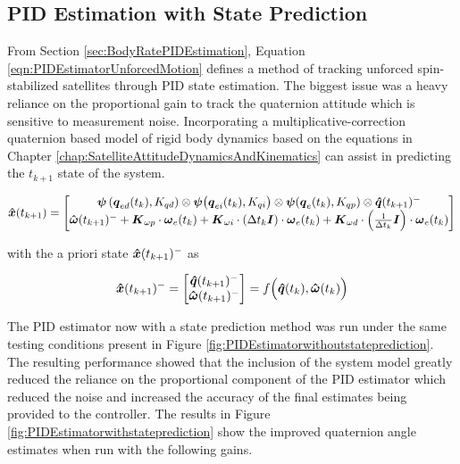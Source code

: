 \subsection{PID Estimation with State Prediction}
\label{subsec:PIDEstimatorwithStatePrediction}

From Section \ref{sec:BodyRatePIDEstimation}, Equation \ref{eqn:PIDEstimatorUnforcedMotion} defines a method of tracking unforced spin-stabilized satellites through PID state estimation.  The biggest issue was a heavy reliance on the proportional gain to track the quaternion attitude which is sensitive to measurement noise.  Incorporating a multiplicative-correction quaternion based model of rigid body dynamics based on the equations in Chapter \ref{chap:SatelliteAttitudeDynamicsAndKinematics} can assist in predicting the $t_{k+1}$ state of the system.

\begin{equation}
  \boldsymbol{\hat{x}}(t_{k+1}) = \begin{bmatrix} \boldsymbol{\psi}\left(\boldsymbol{q}_{ed}(t_k), K_{qd}\right) \otimes \boldsymbol{\psi}\big(\boldsymbol{q}_{ei}(t_k), K_{qi}\big) \otimes \boldsymbol{\psi}(\boldsymbol{q}_e(t_{k}), K_{qp})  \otimes \boldsymbol{\hat{q}}(t_{k+1})^- \\
  \boldsymbol{\hat{\omega}}(t_{k+1})^- + \boldsymbol{K}_{\omega p} \cdot \boldsymbol{\omega}_e(t_{k}) + \boldsymbol{K}_{\omega i} \cdot (\Delta t_k \boldsymbol{I})\cdot \boldsymbol{\omega}_e(t_{k}) + \boldsymbol{K}_{\omega d} \cdot \left(\frac{1}{\Delta t_k} \boldsymbol{I}\right) \cdot \boldsymbol{\omega}_e(t_{k}) \end{bmatrix}
  \label{eqn:PIDEstimatorwithPredictionUnforcedMotion}
\end{equation}

with the a priori state $\boldsymbol{\hat{x}}(t_{k+1})^-$ as

\begin{equation}
  \boldsymbol{\hat{x}}(t_{k+1})^- = \begin{bmatrix}\boldsymbol{\hat{q}}(t_{k+1})^- \\ \boldsymbol{\hat{\omega}}(t_{k+1})^- \end{bmatrix} = f \Big( \boldsymbol{\hat{q}}(t_{k}), \boldsymbol{\hat{\omega}}(t_{k}) \Big)
\end{equation}

The PID estimator now with a state prediction method was run under the same testing conditions present in Figure \ref{fig:PIDEstimatorwithoutstateprediction}.  The resulting performance showed that the inclusion of the system model greatly reduced the reliance on the proportional component of the PID estimator which reduced the noise and increased the accuracy of the final estimates being provided to the controller.  The results in Figure \ref{fig:PIDEstimatorwithstateprediction} show the improved quaternion angle estimates when run with the following gains.

